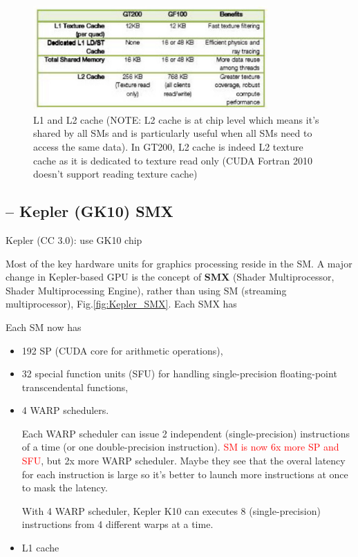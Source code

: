 \begin{figure}[hbt]
  \centerline{\includegraphics[height=4cm,
    angle=0]{./images/L1_L2_cache.eps}}
  \caption{L1 and L2 cache (NOTE: L2 cache is at chip level which
    means it's shared by all SMs and is particularly useful when all
    SMs need to access the same data). In GT200, L2 cache is indeed L2
    texture cache as it is dedicated to texture read only (CUDA
    Fortran 2010 doesn't support reading texture cache)}
\label{fig:L1_L2}
\end{figure}

\subsection{-- Kepler (GK10) SMX}
\label{sec:SM-Kepler}
\label{sec:Kepler_SMX}
  
Kepler (CC 3.0): use GK10 chip 

Most of the key hardware units for graphics processing reside in the SM.
A major change in Kepler-based GPU is the concept of {\bf SMX} (Shader
Multiprocessor, Shader Multiprocessing Engine), rather than using SM (streaming
multiprocessor), Fig.\ref{fig:Kepler_SMX}. Each SMX has


Each SM now has 
\begin{itemize}
   \item 192 SP (CUDA core for arithmetic operations), 
   
   \item 32 special function units (SFU) for handling single-precision floating-point
   transcendental functions, 
   
   
   \item 4 WARP schedulers.
 
 Each WARP scheduler can issue 2 independent (single-precision)
   instructions of a time (or one double-precision instruction).
   \textcolor{red}{SM is now 6x more SP and SFU}, but 2x more WARP scheduler.
   Maybe they see that the overal latency for each instruction is large so it's
   better to launch more instructions at once to mask the latency.
   
   With 4 WARP scheduler, Kepler K10 can executes 8 (single-precision)
   instructions from 4 different warps at a time. 
   
   \item L1 cache 
 \end{itemize}
   

